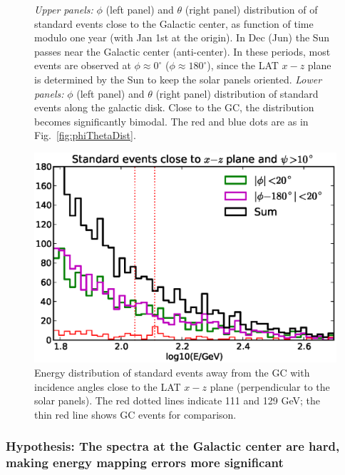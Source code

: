 \documentclass[aps,twocolumn,prd,superscriptaddress,showpacs,nofootinbib,fixfloat]{revtex4}
\begin{document}
\begin{figure}
  \caption{\emph{Upper panels:} $\phi$ (left panel) and
  $\theta$ (right panel) distribution of of standard events
  close to the Galactic center, as function of time modulo
  one year (with Jan 1st at the origin). In Dec (Jun) the
  Sun passes near the Galactic center (anti-center).  In
  these periods, most events are observed at $\phi\approx
  0^\circ$ ($\phi\approx 180^\circ$), since the LAT $x-z$
  plane is determined by the Sun to keep the solar panels
  oriented. \emph{Lower panels:} $\phi$ (left panel) and
  $\theta$ (right panel) distribution of standard events
  along the galactic disk. Close to the GC, the distribution
  becomes significantly bimodal. The red and blue dots are
  as in Fig.~\ref{fig:phiThetaDist}.}
  \label{fig:time_phi}
\end{figure}

\begin{figure}
  \centering
  \includegraphics[width=1.0\linewidth]{plots/phi_energy.eps}
  \caption{Energy distribution of standard events away from the GC with
  incidence angles close to the LAT $x-z$ plane (perpendicular to the solar
  panels). The red dotted lines indicate 111 and 129 GeV; the thin red line
  shows GC events for comparison.}
  \label{fig:spectrum_phi}
\end{figure}

\subsubsection{Hypothesis: The spectra at the Galactic
center are hard, making energy mapping errors more
significant}
\end{document}
